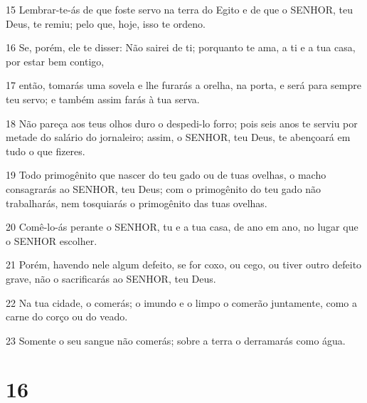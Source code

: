 \par 15 Lembrar-te-ás de que foste servo na terra do Egito e de que o SENHOR, teu Deus, te remiu; pelo que, hoje, isso te ordeno.
\par 16 Se, porém, ele te disser: Não sairei de ti; porquanto te ama, a ti e a tua casa, por estar bem contigo,
\par 17 então, tomarás uma sovela e lhe furarás a orelha, na porta, e será para sempre teu servo; e também assim farás à tua serva.
\par 18 Não pareça aos teus olhos duro o despedi-lo forro; pois seis anos te serviu por metade do salário do jornaleiro; assim, o SENHOR, teu Deus, te abençoará em tudo o que fizeres.
\par 19 Todo primogênito que nascer do teu gado ou de tuas ovelhas, o macho consagrarás ao SENHOR, teu Deus; com o primogênito do teu gado não trabalharás, nem tosquiarás o primogênito das tuas ovelhas.
\par 20 Comê-lo-ás perante o SENHOR, tu e a tua casa, de ano em ano, no lugar que o SENHOR escolher.
\par 21 Porém, havendo nele algum defeito, se for coxo, ou cego, ou tiver outro defeito grave, não o sacrificarás ao SENHOR, teu Deus.
\par 22 Na tua cidade, o comerás; o imundo e o limpo o comerão juntamente, como a carne do corço ou do veado.
\par 23 Somente o seu sangue não comerás; sobre a terra o derramarás como água.

\chapter{16}

